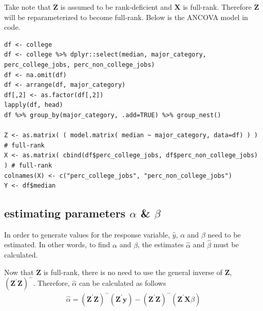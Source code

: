\documentclass[10pt, twoside, openleft]{article}
\newcommand{\alphahat}{\hat{\alpha}} %
\newcommand{\betahat}{\hat{\beta}} %
\newcommand{\yhat}{\hat{y}} %
\begin{document}
Take note that $\mathbf{Z}$ is assumed to be rank-deficient and $\mathbf{X}$ is full-rank.
Therefore $\mathbf{Z}$ will be reparameterized to become full-rank. Below is the ANCOVA
model in code.

\begin{verbatim}
df <- college
df <- college %>% dplyr::select(median, major_category, perc_college_jobs, perc_non_college_jobs)
df <- na.omit(df)
df <- arrange(df, major_category)
df[,2] <- as.factor(df[,2])
lapply(df, head)
df %>% group_by(major_category, .add=TRUE) %>% group_nest()

Z <- as.matrix( ( model.matrix( median ~ major_category, data=df) ) ) # full-rank
X <- as.matrix( cbind(df$perc_college_jobs, df$perc_non_college_jobs) ) # full-rank
colnames(X) <- c("perc_college_jobs", "perc_non_college_jobs")
Y <- df$median
\end{verbatim}

\begin{center}
\subsection{estimating parameters $\alpha$ \& $\beta$}
\vspace{-3ex}
\end{center}

\noindent
In order to generate values for the response variable, $\yhat$, $\alpha$ and $\beta$ need to be
estimated. In other words, to find $\alpha$ and $\beta$, the estimates $\alphahat$ and $\betahat$
must be calculated.
\smallskip

Now that $\mathbf{Z}$ is full-rank, there is no need to use the general inverse of $\mathbf{Z}$,
$(\mathbf{Z}^{'} \mathbf{Z})^{-}$. Therefore, $\alphahat$ can be calculated as follows
\begin{equation*}
\begin{aligned}
\alphahat = ( \mathbf{Z}^{'} \mathbf{Z} )^{-} ( \mathbf{Z}^{'} \mathbf{y} ) -
( \mathbf{Z}^{'} \mathbf{Z} )^{-} ( \mathbf{Z}^{'} \mathbf{X} \betahat )
\end{aligned}
\end{equation*}
\smallskip
\end{document}
